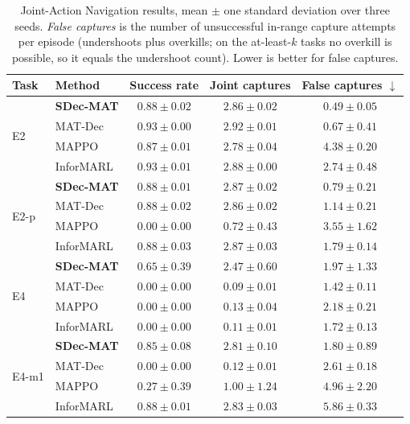 \begin{table}[h]
\centering
\caption{Joint-Action Navigation results, mean $\pm$ one standard deviation
over three seeds. \emph{False captures} is the number of unsuccessful in-range
capture attempts per episode (undershoots plus overkills; on the at-least-$k$
tasks no overkill is possible, so it equals the undershoot count). Lower is
better for false captures.}
\label{tab:jointnav-results}
\small
\begin{tabular}{llccc}
\toprule
Task & Method & Success rate & Joint captures & False captures $\downarrow$ \\
\midrule
\multirow{4}{*}{E2}
 & \textbf{SDec-MAT} & $0.88 \pm 0.02$ & $2.86 \pm 0.02$ & $\mathbf{0.49 \pm 0.05}$ \\
 & MAT-Dec           & $0.93 \pm 0.00$ & $2.92 \pm 0.01$ & $0.67 \pm 0.41$ \\
 & MAPPO             & $0.87 \pm 0.01$ & $2.78 \pm 0.04$ & $4.38 \pm 0.20$ \\
 & InforMARL         & $0.93 \pm 0.01$ & $2.88 \pm 0.00$ & $2.74 \pm 0.48$ \\
\midrule
\multirow{4}{*}{E2-p}
 & \textbf{SDec-MAT} & $0.88 \pm 0.01$ & $2.87 \pm 0.02$ & $\mathbf{0.79 \pm 0.21}$ \\
 & MAT-Dec           & $0.88 \pm 0.02$ & $2.86 \pm 0.02$ & $1.14 \pm 0.21$ \\
 & MAPPO             & $0.00 \pm 0.00$ & $0.72 \pm 0.43$ & $3.55 \pm 1.62$ \\
 & InforMARL         & $0.88 \pm 0.03$ & $2.87 \pm 0.03$ & $1.79 \pm 0.14$ \\
\midrule
\multirow{4}{*}{E4}
 & \textbf{SDec-MAT} & $\mathbf{0.65 \pm 0.39}$ & $\mathbf{2.47 \pm 0.60}$ & $1.97 \pm 1.33$ \\
 & MAT-Dec           & $0.00 \pm 0.00$ & $0.09 \pm 0.01$ & $1.42 \pm 0.11$ \\
 & MAPPO             & $0.00 \pm 0.00$ & $0.13 \pm 0.04$ & $2.18 \pm 0.21$ \\
 & InforMARL         & $0.00 \pm 0.00$ & $0.11 \pm 0.01$ & $1.72 \pm 0.13$ \\
\midrule
\multirow{4}{*}{E4-m1}
 & \textbf{SDec-MAT} & $0.85 \pm 0.08$ & $2.81 \pm 0.10$ & $\mathbf{1.80 \pm 0.89}$ \\
 & MAT-Dec           & $0.00 \pm 0.00$ & $0.12 \pm 0.01$ & $2.61 \pm 0.18$ \\
 & MAPPO             & $0.27 \pm 0.39$ & $1.00 \pm 1.24$ & $4.96 \pm 2.20$ \\
 & InforMARL         & $0.88 \pm 0.01$ & $2.83 \pm 0.03$ & $5.86 \pm 0.33$ \\
\bottomrule
\end{tabular}
\end{table}

